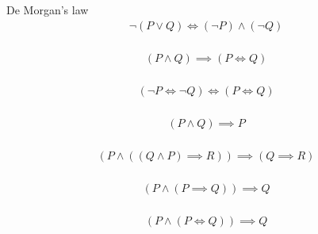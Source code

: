 \begin{prop}
\label{Proposition:De_Morgan_2}
De Morgan's law
\begin{align*}
\lnot (P \lor Q) \iff (\lnot P) \land (\lnot Q) \\
\end{align*}
\end{prop}

\begin{prop}
\label{Proposition:land_implies_iff}
\begin{align*}
(P \land Q) \implies  (P \iff Q) \\
\end{align*}
\end{prop}

\begin{prop}
\label{Proposition:iff_contrapositive}
\begin{align*}
(\lnot P \iff \lnot Q) \iff (P \iff Q) \\
\end{align*}
\end{prop}

\begin{prop}
\label{Proposition:land_omit}
\begin{align*}
(P \land Q) \implies P \\
\end{align*}
\end{prop}

\begin{lemma}
\label{Lemma:uniqueness}
\begin{align*}
(P \land ((Q \land P) \implies R)) \implies (Q \implies R) \\
\end{align*}
\end{lemma}

\begin{prop}
\label{Proposition:implies_satisfy}
\begin{align*}
(P \land (P \implies Q)) \implies Q \\
\end{align*}
\end{prop}

\begin{prop}
\label{Proposition:iff_satisfy}
\begin{align*}
(P \land (P \iff Q)) \implies Q \\
\end{align*}
\end{prop}